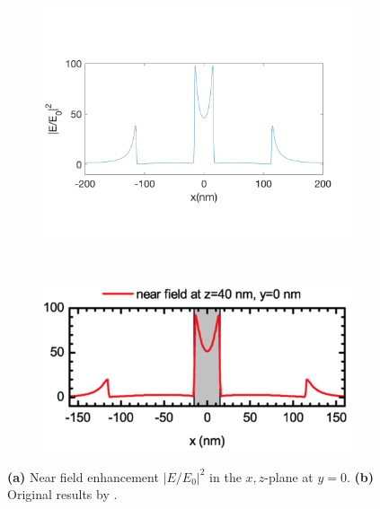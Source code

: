 \begin{figure}[!h]
  \centering
  \begin{subfigure}{0.45\textwidth}
    \includegraphics[width=\textwidth]{./images/40nm-y.png}
  \end{subfigure}
  ~
  \begin{subfigure}{0.45\textwidth}
    \includegraphics[width=\textwidth]{./images/heeg-y-line.png}
  \end{subfigure}
  \caption{\textbf{(a)} Near field enhancement $|E/E_0|^2$ in the $x,z$-plane at $y=0$. \textbf{(b)} Original results by \cite{heeg}.}
\end{figure}

\newpage
\null
